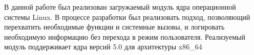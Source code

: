 \Conclusion
    В данной работе был реализован загружаемый модуль ядра операционной системы Linux.
    В процессе разработки был реализовать подход, 
    позволяющий перехватить необходимые функции и системные вызовы,
    и логировать необходимую информацию без перехода в режим пользователя.
    Реализуемый модуль поддерживает ядра версий 5.0 для архитектуры x86\_64 

\pagebreak
